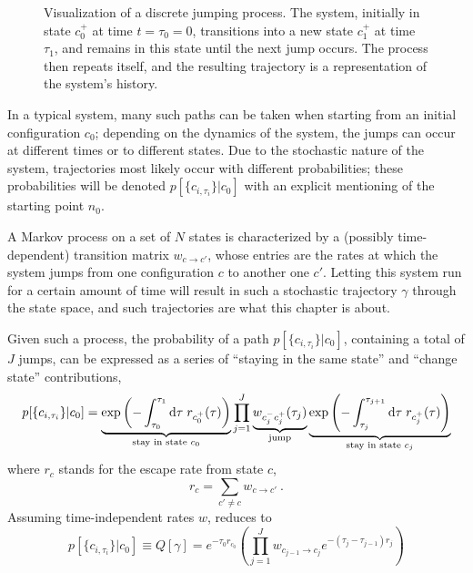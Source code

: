 \begin{figure}[htb]
	\centering
	
	\caption[]{Visualization of a discrete jumping process. The system, initially in state \(c_0^+\) at time \(t = \tau_0 = 0\), transitions into a new state \(c_1^+\) at time \(\tau_1\), and remains in this state until the next jump occurs. The process then repeats itself, and the resulting trajectory is a representation of the system's history.}
	\label{fig:discrete_jumping_process}
\end{figure}

In a typical system, many such paths can be taken when starting from an initial configuration \(c_0\); depending on the dynamics of the system, the jumps can occur at different times or to different states. Due to the stochastic nature of the system, trajectories most likely occur with different probabilities; these probabilities will be denoted \(p[\{c_{i,\tau_i}\}|c_0]\) with an explicit mentioning of the starting point \(n_0\).


A Markov process on a set of \(N\) states is characterized by a (possibly time-dependent) transition matrix \(w_{c\to c'}\), whose entries are the rates at which the system jumps from one configuration \(c\) to another one \(c'\). Letting this system run for a certain amount of time will result in such a stochastic trajectory \(\gamma\) through the state space, and such trajectories are what this chapter is about.


Given such a process, the probability of a path \(p[\{c_{i,\tau_i}\}|c_0]\), containing a total of \(J\) jumps, can be expressed as a series of ``staying in the same state'' and ``change state'' contributions, 
%
\begin{equation}
	\label{eqn:discrete path probability}
	p[\{c_{i,\tau_i}\} | c_0]
	= \underbrace{\operatorname{exp}\left(-\int_{\tau_0}^{\tau_1}\mathrm{d}\tau\;r_{c_0^+}(\tau)\right)}_{\text{stay in state } c_0}
	  \prod_{j=1}^J\underbrace{w_{c_j^-c_j^+}(\tau_j)}_{\text{jump}}
	  \underbrace{\operatorname{exp}\left(-\int_{\tau_j}^{\tau_{j+1}}\mathrm{d}\tau\;r_{c_j^+}(\tau)\right)}_{\text{stay in state } c_j}
\end{equation}
%
where \(r_c\) stands for the escape rate from state \(c\),
%
\begin{equation}
	r_c = \sum_{c'\neq c} w_{c\to c'} ~.
\end{equation}
%
Assuming time-independent rates \(w\),  reduces to
\begin{equation}
	p[\{c_{i,\tau_i}\} | c_0]
	\equiv
	Q[\gamma]
	=
	e^{-\tau_0r_{c_0}} \left(
		\prod_{j = 1}^J
		w_{c_{j-1}\to c_j}
		e^{-(\tau_j-\tau_{j-1})r_j}
		\right)
\end{equation}










